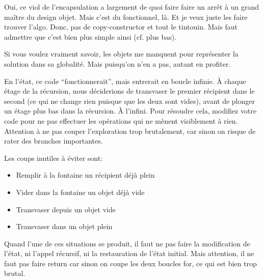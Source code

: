 \documentclass[10pt]{article}\usepackage[correction,nu]{esial}%
\begin{document}
\begin{Reponse}
  Oui, ce viol de l'encapsulation a largement de quoi faire faire un arrêt à un
  grand maître du design objet. Mais c'est du fonctionnel, là. Et je veux juste
  les faire trouver l'algo. Donc, pas de copy-constructor et tout le
  tintouin. Mais faut admettre que c'est bien plus simple ainsi (cf. plus bas). 

  Si vous voulez vraiment savoir, les objets me manquent pour représenter la
  solution dans sa globalité. Mais puisqu'on n'en a pas, autant en profiter.
\end{Reponse}





\Question %
En l'état, ce code ``fonctionnerait'', mais entrerait en boucle infinie. À
chaque étage de la récursion, nous déciderions de transvaser le premier
récipient dans le second (ce qui ne change rien puisque que les deux sont
vides), avant de plonger un étage plus bas dans la récursion. À l'infini.  Pour
résoudre cela, modifiez votre code pour ne pas effectuer les opérations qui ne
mènent visiblement à rien. Attention à ne pas couper l'exploration trop
brutalement, car sinon on risque de rater des branches importantes.
\begin{Reponse}
  Les coups inutiles à éviter sont: 
  \begin{itemize}
  \item Remplir à la fontaine un récipient déjà plein
  \item Vider dans la fontaine un objet déjà vide
  \item Transvaser depuis un objet vide
  \item Transvaser dans un objet plein
  \end{itemize}
  Quand l'une de ces situations se produit, il faut ne pas faire la modification
  de l'état, ni l'appel récursif, ni la restauration de l'état initial. Mais
  attention, il ne faut pas faire return car sinon on coupe les deux boucles
  for, ce qui est bien trop brutal.
\end{Reponse}
\end{document}
